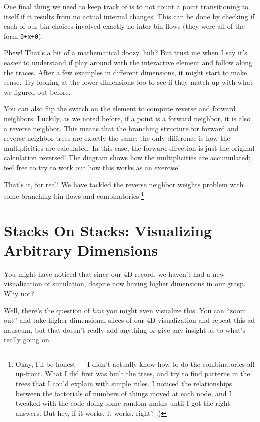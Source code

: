 \documentclass[]{article}
\begin{document}
One final thing we need to keep track of is to not count a point transitioning
to itself if it results from no actual internal changes. This can be done by
checking if each of our bin choices involved exactly no inter-bin flows (they
were all of the form \texttt{0+x+0}).

Phew! That's a bit of a mathematical doozy, huh? But trust me when I say it's
easier to understand if play around with the interactive element and follow
along the traces. After a few examples in different dimensions, it might start
to make sense. Try looking at the lower dimensions too to see if they match up
with what we figured out before.

You can also flip the switch on the element to compute reverse and forward
neighbors. Luckily, as we noted before, if a point is a forward neighbor, it is
also a reverse neighbor. This means that the branching structure for forward and
reverse neighbor trees are exactly the same; the only difference is how the
multiplicities are calculated. In this case, the forward direction is just the
original calculation reversed! The diagram shows how the multiplicities are
accumulated; feel free to try to work out how this works as an exercise!

That's it, for real! We have tackled the reverse neighbor weights problem with
some branching bin flows and combinatorics!\footnote{Okay, I'll be honest --- I
  didn't actually know how to do the combinatorics all up-front. What I did
  first was built the trees, and try to find patterns in the trees that I could
  explain with simple rules. I noticed the relationships between the factorials
  of numbers of things moved at each node, and I tweaked with the code doing
  some random maths until I got the right answers. But hey, if it works, it
  works, right? :)}

\hypertarget{stacks-on-stacks-visualizing-arbitrary-dimensions}{%
\section{Stacks On Stacks: Visualizing Arbitrary
Dimensions}\label{stacks-on-stacks-visualizing-arbitrary-dimensions}}

You might have noticed that since our 4D record, we haven't had a new
visualization of simulation, despite now having higher dimensions in our grasp.
Why not?

Well, there's the question of \emph{how} you might even visualize this. You can
``zoom out'' and take higher-dimensional slices of our 4D visualization and
repeat this ad nauseum, but that doesn't really add anything or give any insight
as to what's really going on.
\end{document}
